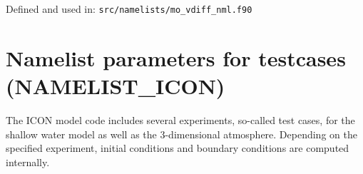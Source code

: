 Defined and used in: \verb+src/namelists/mo_vdiff_nml.f90+

%

%
%



\section{Namelist parameters for testcases (NAMELIST\_ICON)}

The ICON model code includes several experiments, so-called test cases,
for the shallow water model as well as the 3-dimensional atmosphere.
Depending on the specified experiment, initial conditions and boundary
conditions are computed internally.

